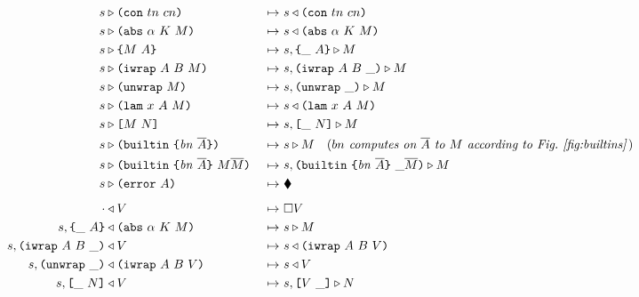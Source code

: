 \documentclass[../zerepoch-core-specification.tex]{subfiles}
\begin{document}
\begin{figure}[H]
\begin{subfigure}[c]{\linewidth}
\hspace{-1cm}\begin{minipage}{\linewidth}
\begin{alignat*}{2}
  s & \compute \con{tn}{cn}                 &~\mapsto~&  s \return \con{tn}{cn}\\
  s & \compute \abs{\alpha}{K}{M}           &~\mapsto~&  s \return \abs{\alpha}{K}{M}\\
  s & \compute \inst{M}{A}                  &~\mapsto~&  s,\inInstLeftFrame{A} \compute M\\
  s & \compute \wrap{A}{B}{M}               &~\mapsto~&  s,\inWrapRightFrame{A}{B} \compute M\\
  s & \compute \unwrap{M}                   &~\mapsto~&  s,\inUnwrapFrame{} \compute M\\
  s & \compute \lam{x}{A}{M}                &~\mapsto~&  s \return \lam{x}{A}{M}\\
  s & \compute \app{M}{N}                   &~\mapsto~&  s,\inAppLeftFrame{N} \compute M\\
  s & \compute \builtin{bn}{\repetition{A}}{\!\!}
                                            &~\mapsto~&  s \compute M
                                            \quad (\textit{$bn$ computes on $\repetition{A}$ to $M$ according to Fig.~\ref{fig:builtins}}\,)\\
  s & \compute \builtin{bn}{\repetition{A}}{M \repetition{M}}
                                            &~\mapsto~&  s,\inBuiltin{bn}{\repetition{A}}{}{\_}{\repetition{M}} \compute M\\
  s & \compute \error{A}                    &~\mapsto~&  \ckerror{}\\
  \\[-10pt] %
  \cdot& \return V                          &~\mapsto~&  \square V\\
  s,\inInstLeftFrame{A} & \return \abs{\alpha}{K}{M}
                                            &~\mapsto~&  s \compute M\\
  s,\inWrapRightFrame{A}{B} & \return V     &~\mapsto~&  s \return \wrap{A}{B}{V}\\
  s,\inUnwrapFrame{} & \return \wrap{A}{B}{V}
                                            &~\mapsto~&  s \return V\\
  s,\inAppLeftFrame{N} & \return V          &~\mapsto~&  s,\inAppRightFrame{V} \compute N\\

\end{alignat*}
\end{minipage}
\end{subfigure}
\end{figure}
\end{document}

